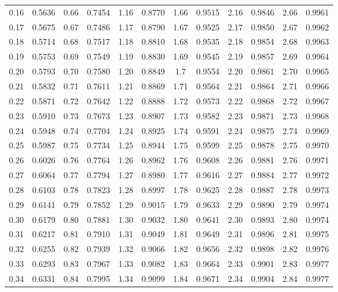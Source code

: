 \begin{table}
\begin{otherlanguage}{english}
\begin{tabular}{|C|C||C|C||C|C||C|C||C|C||C|C|}
0.16 & 0.5636 & 0.66 & 0.7454 & 1.16 & 0.8770 & 1.66 & 0.9515 & 2.16 & 0.9846 & 2.66 & 0.9961 \\
0.17 & 0.5675 & 0.67 & 0.7486 & 1.17 & 0.8790 & 1.67 & 0.9525 & 2.17 & 0.9850 & 2.67 & 0.9962 \\
0.18 & 0.5714 & 0.68 & 0.7517 & 1.18 & 0.8810 & 1.68 & 0.9535 & 2.18 & 0.9854 & 2.68 & 0.9963 \\
0.19 & 0.5753 & 0.69 & 0.7549 & 1.19 & 0.8830 & 1.69 & 0.9545 & 2.19 & 0.9857 & 2.69 & 0.9964 \\
0.20 & 0.5793 & 0.70 & 0.7580 & 1.20 & 0.8849 & 1.7 & 0.9554 & 2.20 & 0.9861 & 2.70& 0.9965 \\[1ex]
0.21 & 0.5832 & 0.71 & 0.7611 & 1.21 & 0.8869 & 1.71 & 0.9564 & 2.21 & 0.9864 & 2.71 & 0.9966 \\
0.22 & 0.5871 & 0.72 & 0.7642 & 1.22 & 0.8888 & 1.72 & 0.9573 & 2.22 & 0.9868 & 2.72 & 0.9967 \\
0.23 & 0.5910 & 0.73 & 0.7673 & 1.23 & 0.8907 & 1.73 & 0.9582 & 2.23 & 0.9871 & 2.73 & 0.9968 \\
0.24 & 0.5948 & 0.74 & 0.7704 & 1.24 & 0.8925 & 1.74 & 0.9591 & 2.24 & 0.9875 & 2.74 & 0.9969 \\
0.25 & 0.5987 & 0.75 & 0.7734 & 1.25 & 0.8944 & 1.75 & 0.9599 & 2.25 & 0.9878 & 2.75 & 0.9970 \\[1ex]
0.26 & 0.6026 & 0.76 & 0.7764 & 1.26 & 0.8962 & 1.76 & 0.9608 & 2.26 & 0.9881 & 2.76 & 0.9971 \\
0.27 & 0.6064 & 0.77 & 0.7794 & 1.27 & 0.8980 & 1.77 & 0.9616 & 2.27 & 0.9884 & 2.77 & 0.9972 \\
0.28 & 0.6103 & 0.78 & 0.7823 & 1.28 & 0.8997 & 1.78 & 0.9625 & 2.28 & 0.9887 & 2.78 & 0.9973 \\
0.29 & 0.6141 & 0.79 & 0.7852 & 1.29 & 0.9015 & 1.79 & 0.9633 & 2.29 & 0.9890 & 2.79 & 0.9974 \\
0.30 & 0.6179 & 0.80 & 0.7881 & 1.30 & 0.9032 & 1.80 & 0.9641 & 2.30 & 0.9893 & 2.80 & 0.9974 \\[1ex]
0.31 & 0.6217 & 0.81 & 0.7910 & 1.31 & 0.9049 & 1.81 & 0.9649 & 2.31 & 0.9896 & 2.81 & 0.9975 \\
0.32 & 0.6255 & 0.82 & 0.7939 & 1.32 & 0.9066 & 1.82 & 0.9656 & 2.32 & 0.9898 & 2.82 & 0.9976 \\
0.33 & 0.6293 & 0.83 & 0.7967 & 1.33 & 0.9082 & 1.83 & 0.9664 & 2.33 & 0.9901 & 2.83 & 0.9977 \\
0.34 & 0.6331 & 0.84 & 0.7995 & 1.34 & 0.9099 & 1.84 & 0.9671 & 2.34 & 0.9904 & 2.84 & 0.9977 \\

\end{tabular}
\end{otherlanguage}
\end{table}
